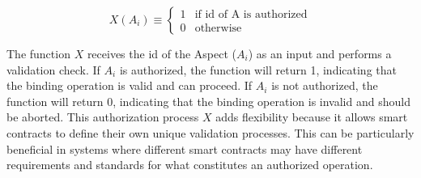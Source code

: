 \[
X(A_i) \equiv
\begin{cases}
  1 & \text{if id of A is authorized} \\
  0 & \text{otherwise}
\end{cases}
\]

The function $X$ receives the id of the Aspect ($A_i$) as an input and performs a validation check. If $A_i$ is authorized, the function will return 1, indicating that the binding operation is valid and can proceed. If $A_i$ is not authorized, the function will return 0, indicating that the binding operation is invalid and should be aborted. This authorization process $X$ adds flexibility because it allows smart contracts to define their own unique validation processes. This can be particularly beneficial in systems where different smart contracts may have different requirements and standards for what constitutes an authorized operation.
